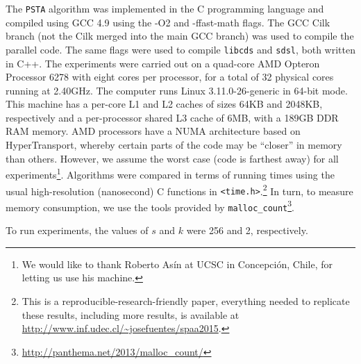 The {\tt PSTA} algorithm was implemented in the C programming language
and compiled using GCC 4.9 using the -O2 and -ffast-math flags. The
GCC Cilk branch (not the Cilk merged into the main GCC branch) was
used to compile the parallel code. The same flags were used to compile
{\tt libcds} and {\tt sdsl}, both written in C++. The experiments were
carried out on a quad-core AMD Opteron\texttrademark{} Processor 6278
with eight cores per processor, for a total of 32 physical cores
running at 2.40GHz. The computer runs Linux 3.11.0-26-generic in
64-bit mode. This machine has a per-core L1 and L2 caches of sizes
64KB and 2048KB, respectively and a per-processor shared L3 cache of
6MB, with a 189GB DDR RAM memory. AMD processors have a NUMA
architecture based on HyperTransport, whereby certain parts of the
code may be ``closer'' in memory than others. However, we assume the
worst case (code is farthest away) for all experiments\footnote{We
would like to thank Roberto As\'in at UCSC in Concepci\'on, Chile, for
letting us use his machine.}. Algorithms were compared in terms of
running times using the usual high-resolution (nanosecond) C functions
in {\tt <time.h>}.\footnote{This is a reproducible-research-friendly
paper, everything needed to replicate these results, including more
results, is available at
\url{http://www.inf.udec.cl/~josefuentes/spaa2015}.} In turn, to measure
memory consumption, we use the tools provided by
\verb+malloc_count+\footnote{\url{http://panthema.net/2013/malloc_count/}}.

To run experiments, the values of $s$ and $k$ were 256 and 2, respectively.